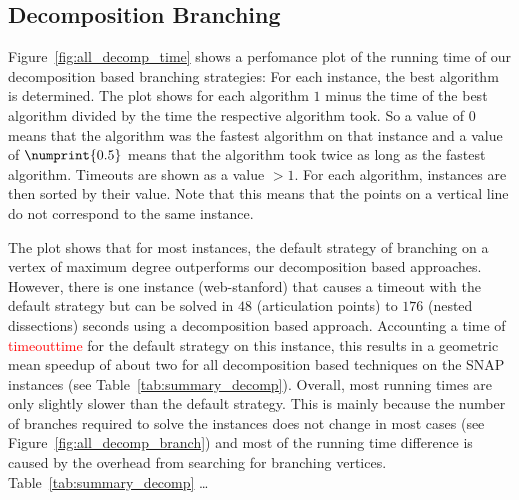 \documentclass[a4paper,UKenglish,cleveref, autoref, thm-restate]{lipics-v2021}
\begin{document}
\subsection{Decomposition Branching}
\label{sec:experiments_decomp}

Figure~\ref{fig:all_decomp_time} shows a perfomance plot of the running time of
our decomposition based branching strategies: For each instance, the best
algorithm is determined. The plot shows for each algorithm $1$ minus the time of the best algorithm
divided by the time the respective algorithm took. So a value of $0$ means that
the algorithm was the fastest algorithm on that instance and a value of
$\numprint{0.5}$ means that the algorithm took twice as long as the fastest
algorithm. Timeouts are shown as a value $> 1$. For each algorithm, instances
are then sorted by their value. Note that this means that the points on a
vertical line do not correspond to the same instance.

The plot shows that for most instances, the default strategy of branching on a
vertex of maximum degree outperforms our decomposition based approaches.
However, there is one instance (web-stanford) that causes a timeout with the
default strategy but can be solved in $48$ (articulation points) to $176$ (nested
dissections) seconds using a decomposition based approach. Accounting a time of
\textcolor{red}{timeouttime} for the default strategy on
this instance, this results in a geometric mean speedup of about two for all
decomposition based techniques on the SNAP instances (see Table~\ref{tab:summary_decomp}). Overall, most running
times are only slightly slower than the default strategy. This is mainly because
the number of branches required to solve the instances does not change in most
cases (see Figure~\ref{fig:all_decomp_branch}) and most of the running time
difference is caused by the overhead from
searching for branching vertices. Table~\ref{tab:summary_decomp} \dots{}
\end{document}

